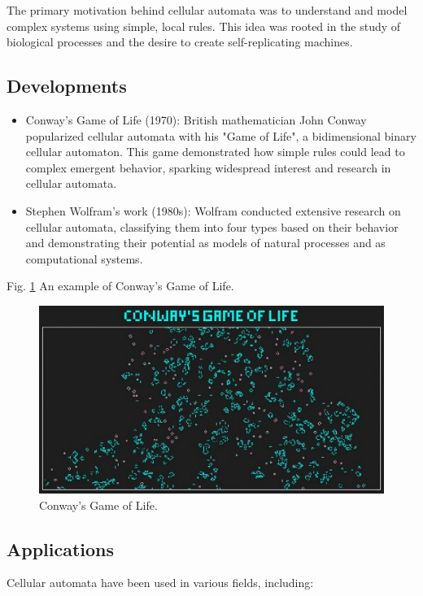 \documentclass[9pt,a4paper,twoside]{tau-class/tau}
\begin{document}
    The primary motivation behind cellular automata was to understand and model complex
    systems using simple, local rules. This idea was rooted in the study of biological 
    processes and the desire to create self-replicating machines.

    \subsection{Developments}
    \begin{itemize}
        \item Conway's Game of Life (1970): British mathematician John Conway popularized cellular
        automata with his "Game of Life", a bidimensional binary cellular automaton. 
        This game demonstrated how simple rules could lead to complex emergent behavior, 
        sparking widespread interest and research in cellular automata.

        \item Stephen Wolfram's work (1980s): Wolfram conducted extensive research on cellular
        automata, classifying them into four types based on their behavior and demonstrating 
        their potential as models of natural processes and as computational systems.
    \end{itemize}

    Fig. \ref{fig:figure} An example of Conway's Game of Life.
	\begin{figure}[H]
		\centering
		\includegraphics[width=0.75\columnwidth]{figures/gameOfLife.jpg}
		\caption{Conway's Game of Life.}
		\label{fig:figure}
	\end{figure}

    \subsection{Applications}
	
        Cellular automata have been used in various fields, including:
        
\end{document}
